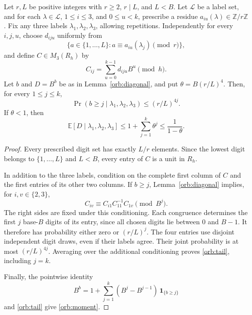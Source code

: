 \begin{lemma}
\label{orb:conditional}
Let $r,L$ be positive integers with $r\geq2$, $r\mid L$, and $L<B$.
Let $\mathscr L$ be a label set, and for each $\lambda\in\mathscr L$,
$1\leq i\leq3$, and $0\leq u<k$, prescribe a residue
$a_{iu}(\lambda)\in\mathbb Z/r\mathbb Z$.
Fix any three labels $\lambda_1,\lambda_2,\lambda_3$, allowing
repetitions.  Independently for every $i,j,u$, choose $d_{iju}$ uniformly
from
\[
 \{a\in\{1,\ldots,L\}:a\equiv a_{iu}(\lambda_j)\pmod r\},
\]
and define $C\in M_3(R_h)$ by
\[
 C_{ij}=\sum_{u=0}^{k-1}d_{iju}B^u\pmod h.
\]
Let $b$ and $D=B^b$ be as in Lemma~\ref{orb:diagonal}, and put
$\theta=B(r/L)^4$.  Then, for every $1\leq j\leq k$,
\begin{equation}
 \Pr(b\geq j\mid\lambda_1,\lambda_2,\lambda_3)
 \leq(r/L)^{4j}.
 \label{orb:tail}
\end{equation}
If $\theta<1$, then
\begin{equation}
 \mathbb E[D\mid\lambda_1,\lambda_2,\lambda_3]
 \leq1+\sum_{j=1}^k\theta^j
 \leq\frac1{1-\theta}.
 \label{orb:moment}
\end{equation}
\end{lemma}

\begin{proof}
Every prescribed digit set has exactly $L/r$ elements.  Since the lowest
digit belongs to $\{1,\ldots,L\}$ and $L<B$, every entry of $C$ is a
unit in $R_h$.

In addition to the three labels, condition on the complete first column
of $C$ and the first entries of its other two columns.  If $b\geq j$,
Lemma~\ref{orb:diagonal} implies, for $i,v\in\{2,3\}$,
\[
 C_{iv}\equiv C_{i1}C_{11}^{-1}C_{1v}\pmod{B^j}.
\]
The right sides are fixed under this conditioning.  Each congruence
determines the first $j$ base-$B$ digits of its entry, since all chosen
digits lie between $0$ and $B-1$.  It therefore has probability either
zero or $(r/L)^j$.  The four entries use disjoint independent digit
draws, even if their labels agree.  Their joint probability is at most
$(r/L)^{4j}$.  Averaging over the additional conditioning proves
\eqref{orb:tail}, including $j=k$.

Finally, the pointwise identity
\[
 B^b=1+\sum_{j=1}^k(B^j-B^{j-1})\,\mathbf1_{\{b\geq j\}}
\]
and \eqref{orb:tail} give \eqref{orb:moment}.
\end{proof}

